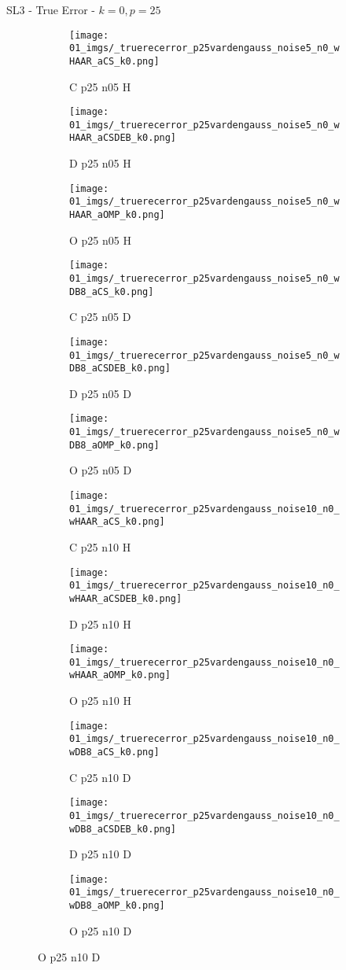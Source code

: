 \begin{frame}{SL3 - True Error - $k=0,p=25$}{}
\begin{figure}
\begin{subfigure}{0.13\textwidth}
\texttt{[image: 01\_imgs/\_truerecerror\_p25vardengauss\_noise5\_n0\_wHAAR\_aCS\_k0.png]}
\caption*{\tiny C p25 n05 H}
\end{subfigure}
\begin{subfigure}{0.13\textwidth}
\texttt{[image: 01\_imgs/\_truerecerror\_p25vardengauss\_noise5\_n0\_wHAAR\_aCSDEB\_k0.png]}
\caption*{\tiny D p25 n05 H}
\end{subfigure}
\begin{subfigure}{0.13\textwidth}
\texttt{[image: 01\_imgs/\_truerecerror\_p25vardengauss\_noise5\_n0\_wHAAR\_aOMP\_k0.png]}
\caption*{\tiny O p25 n05 H}
\end{subfigure}
\begin{subfigure}{0.13\textwidth}
\texttt{[image: 01\_imgs/\_truerecerror\_p25vardengauss\_noise5\_n0\_wDB8\_aCS\_k0.png]}
\caption*{\tiny C p25 n05 D}
\end{subfigure}
\begin{subfigure}{0.13\textwidth}
\texttt{[image: 01\_imgs/\_truerecerror\_p25vardengauss\_noise5\_n0\_wDB8\_aCSDEB\_k0.png]}
\caption*{\tiny D p25 n05 D}
\end{subfigure}
\begin{subfigure}{0.13\textwidth}
\texttt{[image: 01\_imgs/\_truerecerror\_p25vardengauss\_noise5\_n0\_wDB8\_aOMP\_k0.png]}
\caption*{\tiny O p25 n05 D}
\end{subfigure}

\vspace{5pt}

\begin{subfigure}{0.13\textwidth}
\texttt{[image: 01\_imgs/\_truerecerror\_p25vardengauss\_noise10\_n0\_wHAAR\_aCS\_k0.png]}
\caption*{\tiny C p25 n10 H}
\end{subfigure}
\begin{subfigure}{0.13\textwidth}
\texttt{[image: 01\_imgs/\_truerecerror\_p25vardengauss\_noise10\_n0\_wHAAR\_aCSDEB\_k0.png]}
\caption*{\tiny D p25 n10 H}
\end{subfigure}
\begin{subfigure}{0.13\textwidth}
\texttt{[image: 01\_imgs/\_truerecerror\_p25vardengauss\_noise10\_n0\_wHAAR\_aOMP\_k0.png]}
\caption*{\tiny O p25 n10 H}
\end{subfigure}
\begin{subfigure}{0.13\textwidth}
\texttt{[image: 01\_imgs/\_truerecerror\_p25vardengauss\_noise10\_n0\_wDB8\_aCS\_k0.png]}
\caption*{\tiny C p25 n10 D}
\end{subfigure}
\begin{subfigure}{0.13\textwidth}
\texttt{[image: 01\_imgs/\_truerecerror\_p25vardengauss\_noise10\_n0\_wDB8\_aCSDEB\_k0.png]}
\caption*{\tiny D p25 n10 D}
\end{subfigure}
\begin{subfigure}{0.13\textwidth}
\texttt{[image: 01\_imgs/\_truerecerror\_p25vardengauss\_noise10\_n0\_wDB8\_aOMP\_k0.png]}
\caption*{\tiny O p25 n10 D}
\end{subfigure}


\end{figure}
\end{frame}
